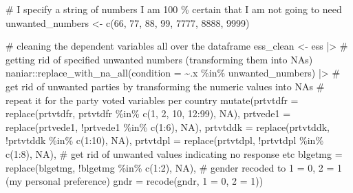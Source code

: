 \documentclass[
  letterpaper,
  DIV=11,
  numbers=noendperiod]{scrreprt}
\newenvironment{Shaded}{\begin{snugshade}}{\end{snugshade}}
\newcommand{\AttributeTok}[1]{\textcolor[rgb]{0.40,0.45,0.13}{#1}}
\newcommand{\CommentTok}[1]{\textcolor[rgb]{0.37,0.37,0.37}{#1}}
\newcommand{\ConstantTok}[1]{\textcolor[rgb]{0.56,0.35,0.01}{#1}}
\newcommand{\DecValTok}[1]{\textcolor[rgb]{0.68,0.00,0.00}{#1}}
\newcommand{\FunctionTok}[1]{\textcolor[rgb]{0.28,0.35,0.67}{#1}}
\newcommand{\NormalTok}[1]{\textcolor[rgb]{0.00,0.23,0.31}{#1}}
\newcommand{\OtherTok}[1]{\textcolor[rgb]{0.00,0.23,0.31}{#1}}
\newcommand{\SpecialCharTok}[1]{\textcolor[rgb]{0.37,0.37,0.37}{#1}}
\newcommand{\StringTok}[1]{\textcolor[rgb]{0.13,0.47,0.30}{#1}}
\begin{document}
\begin{Shaded}
\begin{Highlighting}[]
\CommentTok{\# I specify a string of numbers I am 100 \% certain that I am not going to need}
\NormalTok{unwanted\_numbers }\OtherTok{\textless{}{-}} \FunctionTok{c}\NormalTok{(}\DecValTok{66}\NormalTok{, }\DecValTok{77}\NormalTok{, }\DecValTok{88}\NormalTok{, }\DecValTok{99}\NormalTok{, }\DecValTok{7777}\NormalTok{, }\DecValTok{8888}\NormalTok{, }\DecValTok{9999}\NormalTok{)}

\CommentTok{\# cleaning the dependent variables all over the dataframe}
\NormalTok{ess\_clean }\OtherTok{\textless{}{-}}\NormalTok{ ess }\SpecialCharTok{|\textgreater{}}
  \CommentTok{\# getting rid of specified unwanted numbers (transforming them into NAs)}
\NormalTok{  naniar}\SpecialCharTok{::}\FunctionTok{replace\_with\_na\_all}\NormalTok{(}\AttributeTok{condition =} \SpecialCharTok{\textasciitilde{}}\NormalTok{.x }\SpecialCharTok{\%in\%}\NormalTok{ unwanted\_numbers) }\SpecialCharTok{|\textgreater{}} 
  \CommentTok{\# get rid of unwanted parties by transforming the numeric values into NAs}
  \CommentTok{\# repeat it for the party voted variables per country }
    \FunctionTok{mutate}\NormalTok{(}\AttributeTok{prtvtdfr =} \FunctionTok{replace}\NormalTok{(prtvtdfr, prtvtdfr }\SpecialCharTok{\%in\%} \FunctionTok{c}\NormalTok{(}\DecValTok{1}\NormalTok{, }\DecValTok{2}\NormalTok{, }\DecValTok{10}\NormalTok{, }\DecValTok{12}\SpecialCharTok{:}\DecValTok{99}\NormalTok{), }\ConstantTok{NA}\NormalTok{),}
           \AttributeTok{prtvede1 =} \FunctionTok{replace}\NormalTok{(prtvede1, }\SpecialCharTok{!}\NormalTok{prtvede1 }\SpecialCharTok{\%in\%} \FunctionTok{c}\NormalTok{(}\DecValTok{1}\SpecialCharTok{:}\DecValTok{6}\NormalTok{), }\ConstantTok{NA}\NormalTok{),}
           \AttributeTok{prtvtddk =} \FunctionTok{replace}\NormalTok{(prtvtddk, }\SpecialCharTok{!}\NormalTok{prtvtddk }\SpecialCharTok{\%in\%} \FunctionTok{c}\NormalTok{(}\DecValTok{1}\SpecialCharTok{:}\DecValTok{10}\NormalTok{), }\ConstantTok{NA}\NormalTok{),}
           \AttributeTok{prtvtdpl =} \FunctionTok{replace}\NormalTok{(prtvtdpl, }\SpecialCharTok{!}\NormalTok{prtvtdpl }\SpecialCharTok{\%in\%} \FunctionTok{c}\NormalTok{(}\DecValTok{1}\SpecialCharTok{:}\DecValTok{8}\NormalTok{), }\ConstantTok{NA}\NormalTok{),}
           \CommentTok{\# get rid of unwanted values indicating no response etc}
           \AttributeTok{blgetmg =} \FunctionTok{replace}\NormalTok{(blgetmg, }\SpecialCharTok{!}\NormalTok{blgetmg }\SpecialCharTok{\%in\%} \FunctionTok{c}\NormalTok{(}\DecValTok{1}\SpecialCharTok{:}\DecValTok{2}\NormalTok{), }\ConstantTok{NA}\NormalTok{),}
           \CommentTok{\# gender recoded to 1 = 0, 2 = 1 (my personal preference)}
           \AttributeTok{gndr =} \FunctionTok{recode}\NormalTok{(gndr, }\StringTok{\textasciigrave{}}\AttributeTok{1}\StringTok{\textasciigrave{}} \OtherTok{=} \DecValTok{0}\NormalTok{, }\StringTok{\textasciigrave{}}\AttributeTok{2}\StringTok{\textasciigrave{}} \OtherTok{=} \DecValTok{1}\NormalTok{))}
\end{Highlighting}
\end{Shaded}
\end{document}
